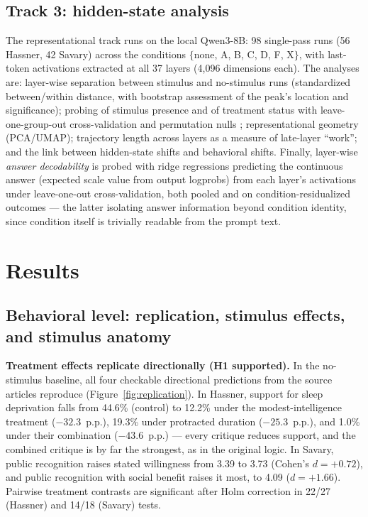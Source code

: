 \documentclass[14pt,a4paper]{extarticle}
\begin{document}
\subsection{Track 3: hidden-state analysis}

The representational track runs on the local Qwen3-8B: 98 single-pass runs (56 Hassner, 42 Savary) across the conditions $\{$none, A, B, C, D, F, X$\}$, with last-token activations extracted at all 37 layers (4{,}096 dimensions each). The analyses are: layer-wise separation between stimulus and no-stimulus runs (standardized between/within distance, with bootstrap assessment of the peak's location and significance); probing \cite{alain2016, belinkov2022} of stimulus presence and of treatment status with leave-one-group-out cross-validation and permutation nulls \cite{hewitt2019}; representational geometry (PCA/UMAP); trajectory length across layers as a measure of late-layer ``work''; and the link between hidden-state shifts and behavioral shifts. Finally, layer-wise \emph{answer decodability} is probed with ridge regressions predicting the continuous answer (expected scale value from output logprobs) from each layer's activations under leave-one-out cross-validation, both pooled and on condition-residualized outcomes --- the latter isolating answer information beyond condition identity, since condition itself is trivially readable from the prompt text.

\section{Results}

\subsection{Behavioral level: replication, stimulus effects, and stimulus anatomy}

\textbf{Treatment effects replicate directionally (H1 supported).} In the no-stimulus baseline, all four checkable directional predictions from the source articles reproduce (Figure~\ref{fig:replication}). In Hassner, support for sleep deprivation falls from 44.6\% (control) to 12.2\% under the modest-intelligence treatment ($-32.3$~p.p.), 19.3\% under protracted duration ($-25.3$~p.p.), and 1.0\% under their combination ($-43.6$~p.p.) --- every critique reduces support, and the combined critique is by far the strongest, as in the original logic. In Savary, public recognition raises stated willingness from 3.39 to 3.73 (Cohen's $d = +0.72$), and public recognition with social benefit raises it most, to 4.09 ($d = +1.66$). Pairwise treatment contrasts are significant after Holm correction in 22/27 (Hassner) and 14/18 (Savary) tests.
\end{document}
